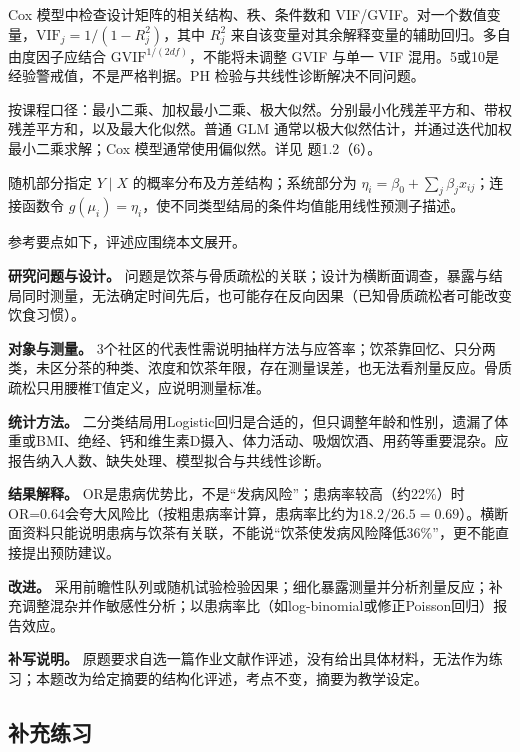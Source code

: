 Cox 模型中检查设计矩阵的相关结构、秩、条件数和 VIF/GVIF。对一个数值变量，\(\mathrm{VIF}_j=1/(1-R_j^2)\)，其中 \(R_j^2\) 来自该变量对其余解释变量的辅助回归。多自由度因子应结合 \(\mathrm{GVIF}^{1/(2df)}\)，不能将未调整 GVIF 与单一 VIF 混用。5或10是经验警戒值，不是严格判据。PH 检验与共线性诊断解决不同问题。



按课程口径：最小二乘、加权最小二乘、极大似然。分别最小化残差平方和、带权残差平方和，以及最大化似然。普通 GLM 通常以极大似然估计，并通过迭代加权最小二乘求解；Cox 模型通常使用偏似然。详见 题1.2（6）。



随机部分指定 \(Y\mid X\) 的概率分布及方差结构；系统部分为 \(\eta_i=\beta_0+\sum_j\beta_jx_{ij}\)；连接函数令 \(g(\mu_i)=\eta_i\)，使不同类型结局的条件均值能用线性预测子描述。



参考要点如下，评述应围绕本文展开。

\textbf{研究问题与设计。} 问题是饮茶与骨质疏松的关联；设计为横断面调查，暴露与结局同时测量，无法确定时间先后，也可能存在反向因果（已知骨质疏松者可能改变饮食习惯）。

\textbf{对象与测量。} 3个社区的代表性需说明抽样方法与应答率；饮茶靠回忆、只分两类，未区分茶的种类、浓度和饮茶年限，存在测量误差，也无法看剂量反应。骨质疏松只用腰椎T值定义，应说明测量标准。

\textbf{统计方法。} 二分类结局用Logistic回归是合适的，但只调整年龄和性别，遗漏了体重或BMI、绝经、钙和维生素D摄入、体力活动、吸烟饮酒、用药等重要混杂。应报告纳入人数、缺失处理、模型拟合与共线性诊断。

\textbf{结果解释。} OR是患病优势比，不是``发病风险''；患病率较高（约22\%）时OR=0.64会夸大风险比（按粗患病率计算，患病率比约为\(18.2/26.5=0.69\)）。横断面资料只能说明患病与饮茶有关联，不能说``饮茶使发病风险降低36\%''，更不能直接提出预防建议。

\textbf{改进。} 采用前瞻性队列或随机试验检验因果；细化暴露测量并分析剂量反应；补充调整混杂并作敏感性分析；以患病率比（如log-binomial或修正Poisson回归）报告效应。

\textbf{补写说明。} 原题要求自选一篇作业文献作评述，没有给出具体材料，无法作为练习；本题改为给定摘要的结构化评述，考点不变，摘要为教学设定。


\subsection{补充练习}

